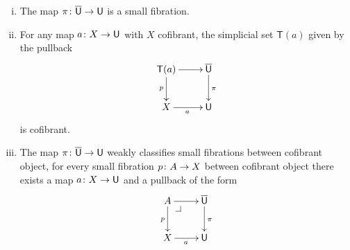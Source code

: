\documentclass[reqno,10pt,a4paper,oneside,draft]{amsart}
\begin{document}
\begin{proposition} \label{thm:universe-u}  \hfill 
\begin{enumerate}[(i)] 
\item The map $\pi \colon \overline{\mathsf{U}} \to \mathsf{U}$ is a small fibration.
\item For any map $a \colon X \rightarrow \mathsf{U}$ with $X$ cofibrant, the 
simplicial set $\mathsf{T}(a)$ given by the pullback
\[
\xymatrix{
\mathsf{T}(a) \ar[r] \ar[d]_p & \UU \ar[d]^\pi \\
X \ar[r]_a & \U }
\]
is cofibrant.
\item The map $\pi \colon \overline{\mathsf{U}} \to \mathsf{U}$ weakly classifies small fibrations between cofibrant object, \ie 
for every small fibration $p \colon A \to X$ between cofibrant object there exists a map 
$a \colon X \to \mathsf{U}$ and a pullback  of the form
\[
\xymatrix{
A \ar[r] \ar[d]_p \drpullback & \UU \ar[d]^\pi \\
X \ar[r]_{a} & \U }
\]
\end{enumerate}
\end{proposition}
\end{document}
